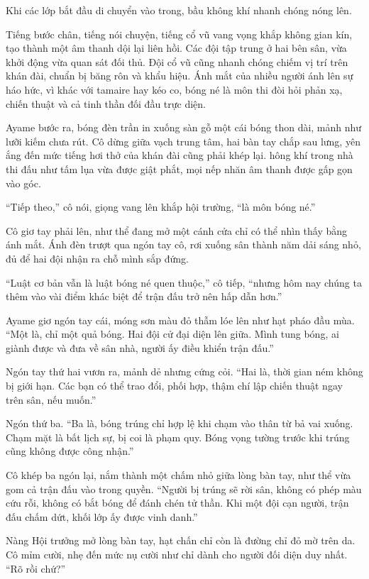 \documentclass[../main.tex]{subfiles}
\begin{document}
Khi các lớp bắt đầu di chuyển vào trong, bầu không khí nhanh chóng nóng lên.

Tiếng bước chân, tiếng nói chuyện, tiếng cổ vũ vang vọng khắp không gian kín, tạo thành một âm thanh dội lại liên hồi. Các đội tập trung ở hai bên sân, vừa khởi động vừa quan sát đối thủ. Đội cổ vũ cũng nhanh chóng chiếm vị trí trên khán đài, chuẩn bị băng rôn và khẩu hiệu. Ánh mắt của nhiều người ánh lên sự háo hức, vì khác với tamaire hay kéo co, bóng né là môn thi đòi hỏi phản xạ, chiến thuật và cả tinh thần đối đầu trực diện.

Ayame bước ra, bóng đèn trần in xuống sàn gỗ một cái bóng thon dài, mảnh như lưỡi kiếm chưa rút. Cô dừng giữa vạch trung tâm, hai bàn tay chắp sau lưng, yên ắng đến mức tiếng hơi thở của khán đài cũng phải khép lại. hông khí trong nhà thi đấu như tấm lụa vừa được giật phắt, mọi nếp nhăn âm thanh được gấp gọn vào góc.

``Tiếp theo,'' cô nói, giọng vang lên khắp hội trường, ``là môn bóng né.''

Cô giơ tay phải lên, như thể đang mở một cánh cửa chỉ có thể nhìn thấy bằng ánh mắt. Ánh đèn trượt qua ngón tay cô, rơi xuống sân thành năm dải sáng nhỏ, đủ để hai đội nhận ra chỗ mình sắp đứng.

``Luật cơ bản vẫn là luật bóng né quen thuộc,'' cô tiếp, ``nhưng hôm nay chúng ta thêm vào vài điểm khác biệt để trận đấu trở nên hấp dẫn hơn.''

Ayame giơ ngón tay cái, móng sơn màu đỏ thẫm lóe lên như hạt pháo đầu mùa. ``Một là, chỉ một quả bóng. Hai đội cử đại diện lên giữa. Mình tung bóng, ai giành được và đưa về sân nhà, người ấy điều khiển trận đấu.''

Ngón tay thứ hai vươn ra, mảnh dẻ nhưng cứng cỏi. ``Hai là, thời gian ném không bị giới hạn. Các bạn có thể trao đổi, phối hợp, thậm chí lập chiến thuật ngay trên sân, nếu muốn.''

Ngón thứ ba. ``Ba là, bóng trúng chỉ hợp lệ khi chạm vào thân từ bả vai xuống. Chạm mặt là bất lịch sự, bị coi là phạm quy. Bóng vọng tường trước khi trúng cũng không được công nhận.''

Cô khép ba ngón lại, nắm thành một chấm nhỏ giữa lòng bàn tay, như thể vừa gom cả trận đấu vào trong quyền. ``Người bị trúng sẽ rời sân, không có phép màu cứu rỗi, không có bắt bóng để đánh chén tử thần. Khi một đội cạn người, trận đấu chấm dứt, khối lớp ấy được vinh danh.''

Nàng Hội trưởng mở lòng bàn tay, hạt chấn chỉ còn là đường chỉ đỏ mờ trên da. Cô mỉm cười, nhẹ đến mức nụ cười như chỉ dành cho người đối diện duy nhất. ``Rõ rồi chứ?''
\end{document}
